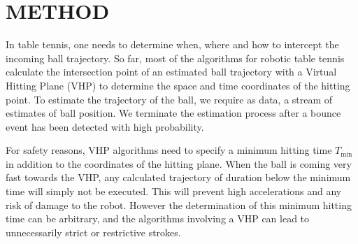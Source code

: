 \documentclass[letterpaper, 10 pt, conference]{ieeeconf}
\begin{document}




\section{METHOD}\label{method}

In table tennis, one needs to determine when, where and how to intercept the incoming ball trajectory. So far, most of the algorithms for robotic table tennis \cite{Muelling13} calculate the intersection point of an estimated ball trajectory with a Virtual Hitting Plane (VHP) to determine the space and time coordinates of the hitting point. To estimate the trajectory of the ball, we require as data, a stream of estimates of ball position. We terminate the estimation process after a bounce event has been detected with high probability. 

For safety reasons, VHP algorithms need to specify a minimum hitting time $T_{\textrm{min}}$ in addition to the coordinates of the hitting plane. When the ball is coming very fast towards the VHP, any calculated trajectory of duration below the minimum time will simply not be executed. This will prevent high accelerations and any risk of damage to the robot. However the determination of this minimum hitting time can be arbitrary, and the algorithms involving a VHP can lead to unnecessarily strict or restrictive strokes.
\end{document}
